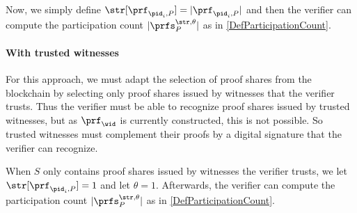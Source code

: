 Now, we simply define \(\str[\prf_{\pid_i, P}] = |\prf_{\pid_i, P}|\) and then the verifier can compute the participation count \(|\prfs_P^{\str, \theta}|\) as in \cref{DefParticipationCount}.

\paragraph{With trusted witnesses}

For this approach, we must adapt the selection of proof shares from the blockchain by selecting only proof shares issued by witnesses that the verifier trusts.
Thus the verifier must be able to recognize proof shares issued by trusted witnesses, but as \(\prf_\wid\) is currently constructed, this is not possible.
So trusted witnesses must complement their proofs by a digital signature that the verifier can recognize.

When \(S\) only contains proof shares issued by witnesses the verifier trusts, we let \(\str[\prf_{\pid_i, P}] = 1\) and let \(\theta = 1\).
Afterwards, the verifier can compute the participation count \(|\prfs_P^{\str, \theta}|\) as in \cref{DefParticipationCount}.
